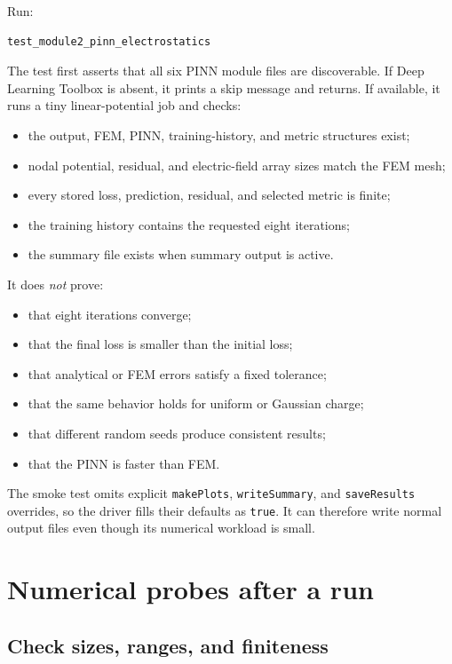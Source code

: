 \documentclass[11pt]{article}
\begin{document}
Run:
\begin{lstlisting}[style=projectmatlab]
test_module2_pinn_electrostatics
\end{lstlisting}
The test first asserts that all six PINN module files are discoverable. If Deep Learning Toolbox is absent, it prints a skip message and returns. If available, it runs a tiny linear-potential job and checks:
\begin{itemize}[leftmargin=*]
  \item the output, FEM, PINN, training-history, and metric structures exist;
  \item nodal potential, residual, and electric-field array sizes match the FEM mesh;
  \item every stored loss, prediction, residual, and selected metric is finite;
  \item the training history contains the requested eight iterations;
  \item the summary file exists when summary output is active.
\end{itemize}

It does \emph{not} prove:
\begin{itemize}[leftmargin=*]
  \item that eight iterations converge;
  \item that the final loss is smaller than the initial loss;
  \item that analytical or FEM errors satisfy a fixed tolerance;
  \item that the same behavior holds for uniform or Gaussian charge;
  \item that different random seeds produce consistent results;
  \item that the PINN is faster than FEM.
\end{itemize}

The smoke test omits explicit \texttt{makePlots}, \texttt{writeSummary}, and \texttt{saveResults} overrides, so the driver fills their defaults as \texttt{true}. It can therefore write normal output files even though its numerical workload is small.

\section{Numerical probes after a run}

\subsection{Check sizes, ranges, and finiteness}
\end{document}
